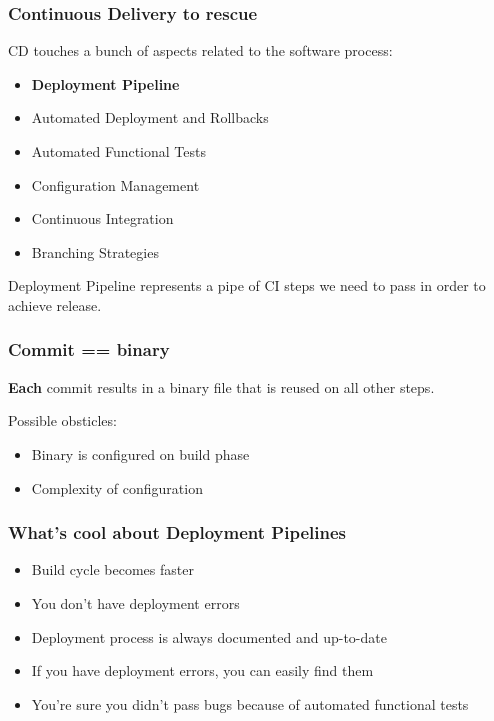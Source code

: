\documentclass{beamer}
\begin{document}
\begin{frame}
  \frametitle{Continuous Delivery to rescue}
  CD touches a bunch of aspects related to the software process:
  \begin{itemize}
    \item \textbf{Deployment Pipeline}
    \item Automated Deployment and Rollbacks
    \item Automated Functional Tests
    \item Configuration Management
    \item Continuous Integration
    \item Branching Strategies
  \end{itemize}
\end{frame}
\begin{frame}
  Deployment Pipeline represents a pipe of CI steps we need to pass in order to achieve release.
\end{frame}
\begin{frame}
  \frametitle{Commit == binary}
  \textbf{Each} commit results in a binary file that is reused on all other steps.

  Possible obsticles:
  \begin{itemize}
    \item Binary is configured on build phase
    \item Complexity of configuration
  \end{itemize}
\end{frame}
\begin{frame}
  \frametitle{What's cool about Deployment Pipelines}
  \begin{itemize}
    \item Build cycle becomes faster
    \item You don't have deployment errors
    \item Deployment process is always documented and up-to-date
    \item If you have deployment errors, you can easily find them
    \item You're sure you didn't pass bugs because of automated functional tests
  \end{itemize}
\end{frame}
\end{document}
